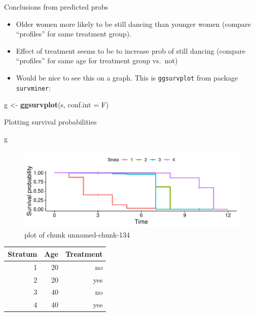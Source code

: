 \documentclass[ignorenonframetext,]{beamer}
\newenvironment{Shaded}{\begin{snugshade}}{\end{snugshade}}
\newcommand{\DataTypeTok}[1]{\textcolor[rgb]{0.13,0.29,0.53}{#1}}
\newcommand{\KeywordTok}[1]{\textcolor[rgb]{0.13,0.29,0.53}{\textbf{#1}}}
\newcommand{\NormalTok}[1]{#1}
\newcommand{\StringTok}[1]{\textcolor[rgb]{0.31,0.60,0.02}{#1}}
\begin{document}
\begin{frame}[fragile]{Conclusions from predicted probs}
\protect\hypertarget{conclusions-from-predicted-probs}{}

\begin{itemize}
\item
  Older women more likely to be still dancing than younger women
  (compare ``profiles'' for same treatment group).
\item
  Effect of treatment seems to be to increase prob of still dancing
  (compare ``profiles'' for same age for treatment group vs.~not)
\item
  Would be nice to see this on a graph. This is \texttt{ggsurvplot} from
  package \texttt{survminer}:
\end{itemize}

\begin{Shaded}
\begin{Highlighting}[]
\NormalTok{g <-}\StringTok{ }\KeywordTok{ggsurvplot}\NormalTok{(s, }\DataTypeTok{conf.int =}\NormalTok{ F)}
\end{Highlighting}
\end{Shaded}

\end{frame}

\begin{frame}[fragile]{Plotting survival probabilities}
\protect\hypertarget{plotting-survival-probabilities}{}

\begin{Shaded}
\begin{Highlighting}[]
\NormalTok{g}
\end{Highlighting}
\end{Shaded}

\begin{figure}
\centering
\includegraphics{figure/unnamed-chunk-134-1.pdf}
\caption{plot of chunk unnamed-chunk-134}
\end{figure}

\begin{small}
\begin{tabular}{rrr}
Stratum& Age& Treatment \\
\hline
1 & 20 & no\\
2 & 20 & yes\\
3 & 40 & no\\
4 & 40 & yes\\
\hline
\end{tabular}  
\end{small}

\end{frame}
\end{document}

